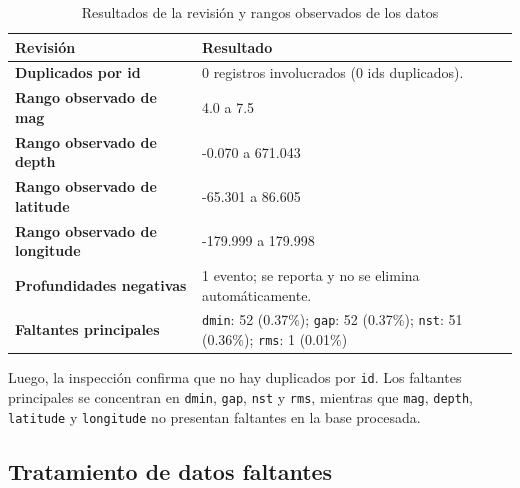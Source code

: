 \documentclass{style}
\newcommand{\var}[1]{\texttt{#1}}
\newcommand{\reporttablesize}{\footnotesize}
\begin{document}
%

\begin{table}[H]
    \centering
    \caption{Resultados de la revisión y rangos observados de los datos}
    \label{tab:control_calidad}
    \scriptsize
    \setlength{\tabcolsep}{10pt}
    \begin{tabular}{ll}
    \toprule
    \textbf{Revisión} & \textbf{Resultado} \\
    \midrule
    \textbf{Duplicados por id} & 0 registros involucrados (0 ids duplicados). \\
    \textbf{Rango observado de mag} & 4.0 a 7.5 \\
    \textbf{Rango observado de depth} & -0.070 a 671.043 \\
    \textbf{Rango observado de latitude} & -65.301 a 86.605 \\
    \textbf{Rango observado de longitude} & -179.999 a 179.998 \\
    \textbf{Profundidades negativas} & 1 evento; se reporta y no se elimina automáticamente. \\
    \textbf{Faltantes principales} & \var{dmin}: 52 (0.37\%); \var{gap}: 52 (0.37\%); \var{nst}: 51 (0.36\%); \var{rms}: 1 (0.01\%) \\
    \bottomrule
    \end{tabular}
\end{table}



Luego, la inspección confirma que no hay duplicados por \var{id}. Los faltantes principales se concentran en \var{dmin}, \var{gap}, \var{nst} y \var{rms}, mientras que \var{mag}, \var{depth}, \var{latitude} y \var{longitude} no presentan faltantes en la base procesada.

\subsection{Tratamiento de datos faltantes}
\end{document}
